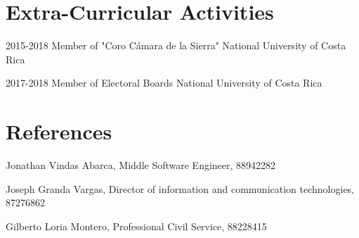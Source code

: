 \documentclass[]{friggeri-cv}
\begin{document}
\section{Extra-Curricular Activities}
\begin{entrylist}
  \entry
    {2015-2018}
    {Member of "Coro Cámara de la Sierra"}
    {National University of Costa Rica}
    
   \entry 
    {2017-2018}
    {Member of Electoral Boards}
    {National University of Costa Rica}
    
\end{entrylist}

\section{References}
\begin{entrylist}
  \entry
    {}
    {Jonathan Vindas Abarca, Middle Software Engineer, 88942282}
    {}
    
    \entry
    {}
    {Joseph Granda Vargas, Director of information and communication technologies, 87276862}
    {}
    
    \entry
    {}
    {Gilberto Loria Montero, Professional Civil Service, 88228415}
    {}
    
    
\end{entrylist}

% 
\end{document}

